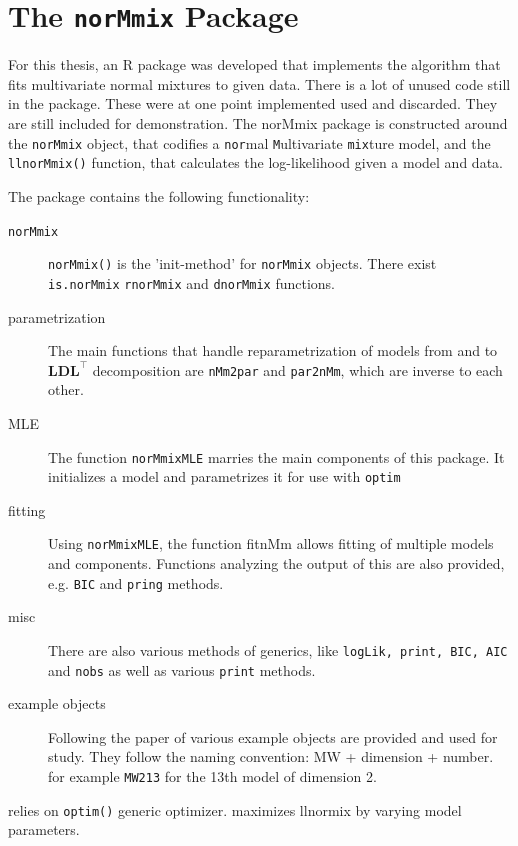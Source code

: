 \chapter{The {\tt norMmix} Package}

For this thesis, an R package was developed that implements the algorithm
that fits multivariate normal mixtures to given data.
There is a lot of unused code still in the package. These were at one point
implemented used and discarded. They are still included for demonstration.
The norMmix package is constructed around the {\tt norMmix} object, that 
codifies a {\tt nor}mal {\tt M}ultivariate {\tt mix}ture model,  and the {\tt 
llnorMmix()} function, that calculates the log-likelihood given a model and 
data.


The package contains the following functionality:
\begin{description}
    \item [{\tt norMmix}] {\tt norMmix()} is the 'init-method' for 
        {\tt norMmix} objects. There exist {\tt is.norMmix} {\tt rnorMmix} and
        {\tt dnorMmix} functions.
    \item [parametrization] The main functions that handle reparametrization
        of models from and to $\pmb{LDL}^\top$ decomposition are {\tt nMm2par}
        and {\tt par2nMm}, which are inverse to each other.
    \item [MLE] The function {\tt norMmixMLE} marries the main components of 
        this package. It initializes a model and parametrizes it for use with 
        {\tt optim}
    \item [fitting] Using {\tt norMmixMLE}, the function fitnMm allows fitting 
        of multiple models and components. Functions analyzing the output of 
        this are also provided, e.g. {\tt BIC} and {\tt pring} methods.
    \item [misc] There are also various methods of generics, like {\tt logLik,
        print, BIC, AIC} and {\tt nobs} as well as various {\tt print} methods.
    \item [example objects] Following the paper of \cite{Mar92} various example
        objects are provided and used for study. They follow the naming 
        convention: MW + dimension + number. for example {\tt MW213} for the 
        13th model of dimension 2.
\end{description}

relies on {\tt optim()} generic optimizer. maximizes llnormix by varying model 
parameters.

